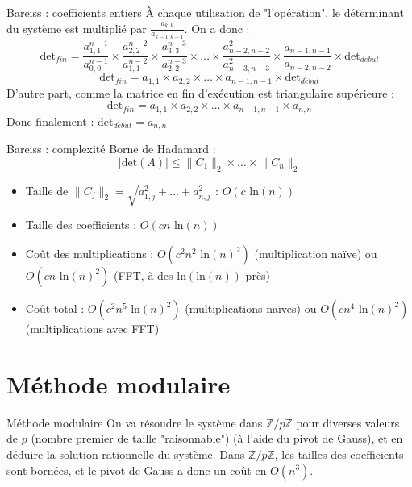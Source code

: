 \documentclass[11pt]{beamer}
\begin{document}
	\begin{frame}{Bareiss : coefficients entiers}
		À chaque utilisation de "l'opération", le déterminant du système est multiplié par $\frac{a_{k,k}}{a_{k-1,k-1}}$.
		\newline
		On a donc :
		$$\mbox{det}_{fin} = \frac{a_{1,1}^{n-1}}{a_{0,0}^{n-1}} \times \frac{a_{2,2}^{n-2}}{a_{1,1}^{n-2}} \times \frac{a_{3,3}^{n-3}}{a_{2,2}^{n-3}} \times \hdots \times \frac{a_{n-2,n-2}^2}{a_{n-3,n-3}^2} \times \frac{a_{n-1,n-1}}{a_{n-2,n-2}} \times \mbox{det}_{d\acute{e}but}$$
		$$\mbox{det}_{fin} = a_{1,1} \times a_{2,2} \times \hdots \times a_{n-1,n-1} \times \mbox{det}_{d\acute{e}but}$$
		D'autre part, comme la matrice en fin d'exécution est triangulaire supérieure :
		$$\mbox{det}_{fin} = a_{1,1} \times a_{2,2} \times \hdots \times a_{n-1,n-1} \times a_{n,n}$$
		Donc finalement : $\mbox{det}_{d\acute{e}but} = a_{n,n}$
	\end{frame}
	
	\begin{frame}{Bareiss : complexité}
		Borne de Hadamard :
		$$ \lvert \mbox{det}(A) \rvert \le \lVert C_1 \rVert_2 \times \hdots \times \lVert C_n \rVert_2$$
		\newline \newline
		\begin{itemize}
			\item Taille de $\lVert C_j \rVert_2 = \sqrt{a_{1,j}^2 + \hdots + a_{n,j}^2}$ : $O(c\mbox{ ln}(n))$
			\item Taille des coefficients : $O(cn\mbox{ ln}(n))$
			\item Coût des multiplications : $O(c^2n^2\mbox{ ln}(n)^2)$ (multiplication naïve) ou $O(cn\mbox{ ln}(n)^2)$ (FFT, à des $\mbox{ln}(\mbox{ln}(n))$ près)
			\item Coût total : $O(c^2 n^5 \mbox{ ln}(n)^2)$ (multiplications naïves) ou $O(c n^4 \mbox{ ln}(n)^2)$ (multiplications avec FFT)
		\end{itemize}
	\end{frame}
	
	\section{Méthode modulaire}
	\begin{frame}{Méthode modulaire}
		On va résoudre le système dans $\mathbb{Z}/p\mathbb{Z}$ pour diverses valeurs de $p$ (nombre premier de taille "raisonnable") (à l'aide du pivot de Gauss), et en déduire la solution rationnelle du système.
		\newline
		\newline
		Dans $\mathbb{Z}/p\mathbb{Z}$, les tailles des coefficients sont bornées, et le pivot de Gauss a donc un coût en $O(n^3)$.
	\end{frame}
	
\end{document}
